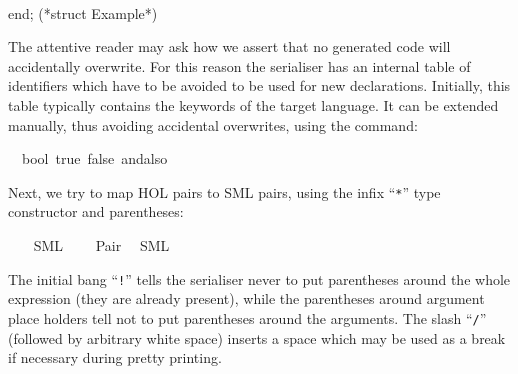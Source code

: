 \begin{isabellebody}
\begin{isamarkuptext}
\hspace*{0pt}\\
\hspace*{0pt}end; (*struct Example*)%
\end{isamarkuptext}%
\isamarkuptrue%
%
\endisatagquote
{\isafoldquote}%
%
\isadelimquote
%
\endisadelimquote
%
\begin{isamarkuptext}%
\noindent The attentive reader may ask how we assert that no generated
  code will accidentally overwrite.  For this reason the serialiser has
  an internal table of identifiers which have to be avoided to be used
  for new declarations.  Initially, this table typically contains the
  keywords of the target language.  It can be extended manually, thus avoiding
  accidental overwrites, using the \hyperlink{command.code-reserved}{\mbox{}} command:%
\end{isamarkuptext}%
\isamarkuptrue%
%
\isadelimquote
%
\endisadelimquote
%
\isatagquote
{}\isamarkupfalse%
\ {\isachardoublequoteopen}{\isasymSML}{\isachardoublequoteclose}\ bool\ true\ false\ andalso%
\endisatagquote
{\isafoldquote}%
%
\isadelimquote
%
\endisadelimquote
%
\begin{isamarkuptext}%
\noindent Next, we try to map HOL pairs to SML pairs, using the
  infix ``\verb|*|'' type constructor and parentheses:%
\end{isamarkuptext}%
\isamarkuptrue%
%
\isadeliminvisible
%
\endisadeliminvisible
%
\isataginvisible
%
\endisataginvisible
{\isafoldinvisible}%
%
\isadeliminvisible
%
\endisadeliminvisible
%
\isadelimquotett
%
\endisadelimquotett
%
\isatagquotett
{}\isamarkupfalse%
\ {\isacharasterisk}\isanewline
\ \ {\isacharparenleft}SML\ \ {}\ {\isachardoublequoteopen}{\isacharasterisk}{\isachardoublequoteclose}{\isacharparenright}\isanewline
{}\isamarkupfalse%
\ Pair\isanewline
\ \ {\isacharparenleft}SML\ {\isachardoublequoteopen}{\isacharbang}{\isacharparenleft}{\isacharparenleft}{\isacharunderscore}{\isacharparenright}{\isacharcomma}{\isacharslash}\ {\isacharparenleft}{\isacharunderscore}{\isacharparenright}{\isacharparenright}{\isachardoublequoteclose}{\isacharparenright}%
\endisatagquotett
{\isafoldquotett}%
%
\isadelimquotett
%
\endisadelimquotett
%
\begin{isamarkuptext}%
\noindent The initial bang ``\verb|!|'' tells the serialiser
  never to put
  parentheses around the whole expression (they are already present),
  while the parentheses around argument place holders
  tell not to put parentheses around the arguments.
  The slash ``\verb|/|'' (followed by arbitrary white space)
  inserts a space which may be used as a break if necessary
  during pretty printing.


\end{isamarkuptext}
\end{isabellebody}

